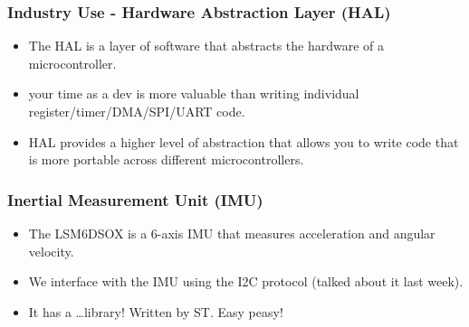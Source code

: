 \documentclass{beamer}
\begin{document}
\begin{frame}
    \frametitle{Industry Use - Hardware Abstraction Layer (HAL)}
    \begin{itemize}
      \item The HAL is a layer of software that abstracts the hardware of a microcontroller.
      \item your time as a dev is more valuable than writing individual register/timer/DMA/SPI/UART code.
      \item HAL provides a higher level of abstraction that allows you to write code that is more portable across different microcontrollers.
    \end{itemize}
\end{frame}


\begin{frame}
    \frametitle{Inertial Measurement Unit (IMU)}
    \begin{itemize}
      \item The LSM6DSOX is a 6-axis IMU that measures acceleration and angular velocity.
      \item We interface with the IMU using the I2C protocol (talked about it last week).
      \item It has a \dots library! Written by ST. Easy peasy!
    \end{itemize}
\end{frame}
\end{document}
